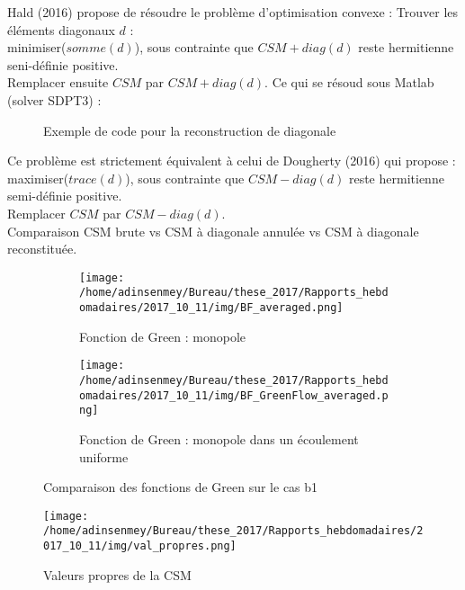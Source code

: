 \documentclass[twocolumn, 12pt, landscape]{article}
\begin{document}
Hald (2016) propose de résoudre le problème d'optimisation convexe : 
Trouver les éléments diagonaux $d$ : \\
minimiser($somme(d)$), sous contrainte que $ CSM + diag(d)$  reste hermitienne seni-définie positive.\\
Remplacer ensuite $CSM$ par $CSM+diag(d)$.
Ce qui se résoud sous Matlab (solver SDPT3)  : 

\begin{figure}[!h]
	\centering
	\caption{Exemple de code pour la reconstruction de diagonale}
\end{figure}

Ce problème est strictement équivalent à celui de Dougherty (2016) qui propose :\\
maximiser($trace(d)$), sous contrainte que $CSM-diag(d)$ reste hermitienne semi-définie positive.\\
Remplacer $CSM$ par $CSM-diag(d)$.\\

Comparaison CSM brute vs CSM à diagonale annulée vs CSM à diagonale reconstituée.



\begin{figure*}[!h]
	\centering
	\begin{subfigure}[b]{0.4\textwidth}
		\texttt{[image: /home/adinsenmey/Bureau/these\_2017/Rapports\_hebdomadaires/2017\_10\_11/img/BF\_averaged.png]}
		\caption{Fonction de Green : monopole}
	\end{subfigure}
	\begin{subfigure}[b]{0.4\textwidth}
		\texttt{[image: /home/adinsenmey/Bureau/these\_2017/Rapports\_hebdomadaires/2017\_10\_11/img/BF\_GreenFlow\_averaged.png]}
		\caption{Fonction de Green : monopole dans un écoulement uniforme}
	\end{subfigure}
	\caption{Comparaison des fonctions de Green sur le cas b1}
	\label{green}
\end{figure*}


\begin{figure*}[h]
	\centering
	\texttt{[image: /home/adinsenmey/Bureau/these\_2017/Rapports\_hebdomadaires/2017\_10\_11/img/val\_propres.png]}
	\caption{Valeurs propres de la CSM}
\end{figure*}
\end{document}

